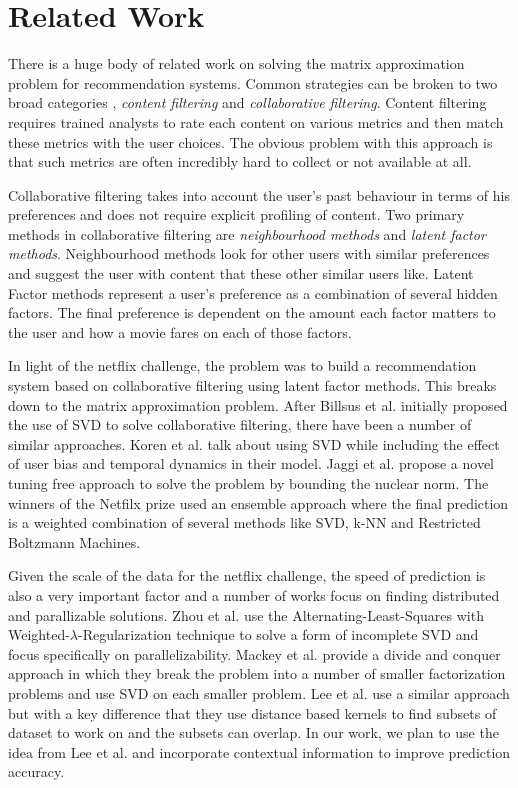 \documentclass[10 pt,table]{article}  %
\begin{document}
\section{Related Work}
There is a huge body of related work on solving the matrix approximation problem for recommendation systems. Common strategies can be broken to two broad categories \cite{koren2009matrix}, {\it content filtering} and {\it collaborative filtering}. Content filtering requires trained analysts to rate each content on various metrics and then match these metrics with the user choices. The obvious problem with this approach is that such metrics are often incredibly hard to collect or not available at all.

Collaborative filtering takes into account the user's past behaviour in terms of his preferences and does not require explicit profiling of content. Two primary methods in collaborative filtering are {\it neighbourhood methods} and {\it latent factor methods}. Neighbourhood methods look for other users with similar preferences and suggest the user with content that these other similar users like. Latent Factor methods represent a user's preference as a combination of several hidden factors. The final preference is dependent on the amount each factor matters to the user and how a movie fares on each of those factors.

In light of the netflix challenge, the problem was to build a recommendation system based on collaborative filtering using latent factor methods. This breaks down to the matrix approximation problem. After Billsus et al. \cite{billsus1998learning} initially proposed the use of SVD to solve collaborative filtering, there have been a number of similar approaches. Koren et al. \cite{koren2009matrix} talk about using SVD while including the effect of user bias and temporal dynamics in their model. Jaggi et al. \cite{jaggi2010simple} propose a novel tuning free approach to solve the problem by bounding the nuclear norm. The winners of the Netfilx prize \cite{bell2007modeling}\cite{sill2009feature} used an ensemble approach where the final prediction is a weighted combination of several methods like SVD, k-NN and Restricted Boltzmann Machines.

Given the scale of the data for the netflix challenge, the speed of prediction is also a very important factor and a number of works focus on finding distributed and parallizable solutions. Zhou et al. \cite{zhou2008large} use the Alternating-Least-Squares with Weighted-${\lambda}$-Regularization technique to solve a form of incomplete SVD and focus specifically on parallelizability. Mackey et al. \cite{mackey2011divide} provide a divide and conquer approach in which they break the problem into a number of smaller factorization problems and use SVD on each smaller problem. Lee et al. \cite{lee2013local} use a similar approach but with a key difference that they use distance based kernels to find subsets of dataset to work on and the subsets can overlap. In our work, we plan to use the idea from Lee et al. \cite{lee2013local} and incorporate contextual information to improve prediction accuracy.
\end{document}
